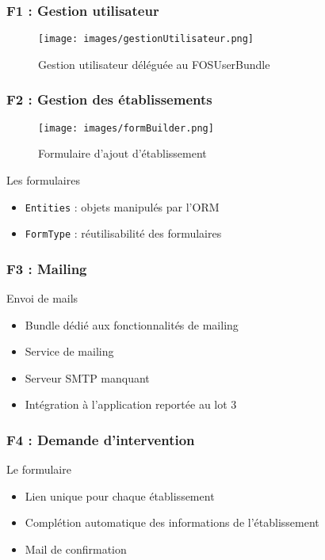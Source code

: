 \speaker{\Florian}

\begin{frame}
\frametitle{F1 : Gestion utilisateur}
      \begin{figure}[h]
	\texttt{[image: images/gestionUtilisateur.png]}
	\caption{Gestion utilisateur déléguée au FOSUserBundle}
		  \end{figure}

\end{frame}

\begin{frame}
\frametitle{F2 : Gestion des établissements}
\begin{minipage}[c]{.35\linewidth}
      \begin{figure}[h]
		\texttt{[image: images/formBuilder.png]}
			\caption{\small{Formulaire d'ajout d'établissement}}
	  \end{figure}
   \end{minipage} \hfill
   \begin{minipage}[c]{.4\linewidth}
      \begin{block}{Les formulaires}
		\begin{itemize}
			\item \texttt{Entities} : objets manipulés par l'ORM
			\item \texttt{FormType} : réutilisabilité des formulaires
		\end{itemize}
	  \end{block}
   \end{minipage} \hfill
\end{frame}

\begin{frame}
\frametitle{F3 : Mailing}
\begin{block}{Envoi de mails}
	\begin{itemize}
		\item Bundle dédié aux fonctionnalités de mailing
		\item Service de mailing
		\item Serveur SMTP manquant
		\item Intégration à l'application reportée au lot 3
	\end{itemize}
\end{block}
\end{frame}

\begin{frame}
\frametitle{F4 : Demande d'intervention}
\begin{block}{Le formulaire}
	\begin{itemize}
		\item Lien unique pour chaque établissement
		\item Complétion automatique des informations de l'établissement
		\item Mail de confirmation
	\end{itemize}
\end{block}
\end{frame}